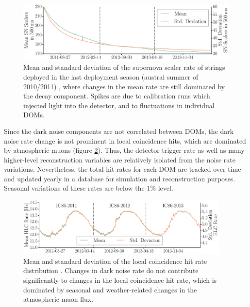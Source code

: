 \begin{figure}[!h]
 \centering
 \includegraphics[width=1.0\textwidth]{graphics/dom/performance/darknoise/SN_Scalers_IC86_mean_variance_Histo_IC86_2011_2012_2013_geomapping.pdf}
 \caption{Mean and standard deviation of the supernova scaler rate of strings
   deployed in the last deployment season (austral summer of 2010/2011)
   \cite{briedel_phd}, where changes in the mean rate are
still dominated by the decay component. Spikes are due to calibration
 runs which injected light into the detector, and to fluctuations in
 individual DOMs.} 
 \label{fig:noise_over_time_briedel_lastseasondepoyed}
\end{figure}

Since the dark noise components are not correlated between
DOMs, the dark noise rate change is not prominent in local coincidence
hits, which are dominated by atmospheric muons (figure
\ref{fig:hlc_over_time_briedel}).  Thus, the detector trigger rate as well
as many higher-level reconstruction variables are relatively isolated from the
noise rate variations.  Nevertheless, the total hit rates for each DOM are
tracked over time and updated yearly in a database for simulation and
reconstruction purposes.  Seasonal variations of these rates are
below the 1\% level.

\begin{figure}[!h]
 \centering
 \includegraphics[width=0.95\textwidth]{graphics/dom/performance/darknoise/HLC_Whole_Detector_Mean_Variance_IC86_2011_2012_2013.pdf}
 \caption{Mean and standard deviation of the local coincidence hit rate distribution
   \cite{briedel_phd}.  Changes in dark noise rate do not
   contribute significantly to changes in the local coincidence hit rate,
  which is dominated by seasonal and weather-related
   changes in the atmospheric muon flux.} 
 \label{fig:hlc_over_time_briedel}
\end{figure}



